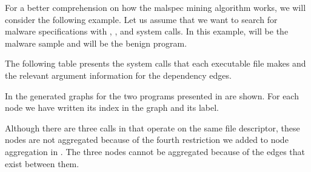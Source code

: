 For a better comprehension on how the malspec mining algorithm works, we will consider the following example. Let us assume that we want to search for malware specifications with , ,  and  system calls. In this example,  will be the malware sample and  will be the benign program.

The following table presents the system calls that each executable file makes and the relevant argument information for the dependency edges.

\begin{center}
\begin{table}[htb]
  \caption{System calls for program_test and diff_test}
  \begin{center}
  \end{center}
  \label{table:test-programs}
\end{table}
\end{center}


In  the generated graphs for the two programs presented in  are shown. For each node we have written its index in the graph and its label.

Although there are three  calls in  that operate on the same file descriptor, these nodes are not aggregated because of the fourth restriction we added to node aggregation in . The three nodes cannot be aggregated because of the edges that exist between them.

